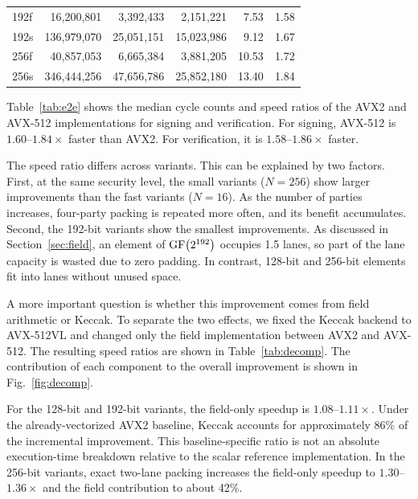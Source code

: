 \begin{table}[h]
{\begin{tabular*}{\linewidth}{
  @{\extracolsep{\fill}}lrrrrr@{}
}
192f
& 16{,}200{,}801
& 3{,}392{,}433
& 2{,}151{,}221
& 7.53
& 1.58 \\

192s
& 136{,}979{,}070
& 25{,}051{,}151
& 15{,}023{,}986
& 9.12
& 1.67 \\

256f
& 40{,}857{,}053
& 6{,}665{,}384
& 3{,}881{,}205
& 10.53
& 1.72 \\

256s
& 346{,}444{,}256
& 47{,}656{,}786
& 25{,}852{,}180
& 13.40
& 1.84 \\

\bottomrule
\end{tabular*}
}
\end{table}

Table~\ref{tab:e2e} shows the median cycle counts and speed ratios of the AVX2 and AVX-512 implementations for signing and verification. For signing, AVX-512 is $1.60$--$1.84\times$ faster than AVX2. For verification, it is $1.58$--$1.86\times$ faster.

The speed ratio differs across variants. This can be explained by two factors. First, at the same security level, the small variants ($N{=}256$) show larger improvements than the fast variants ($N{=}16$). As the number of parties increases, four-party packing is repeated more often, and its benefit accumulates. Second, the 192-bit variants show the smallest improvements. As discussed in Section~\ref{sec:field}, an element of $\operatorname{GF}\bigl(2^{192}\bigr)$ occupies 1.5 lanes, so part of the lane capacity is wasted due to zero padding. In contrast, 128-bit and 256-bit elements fit into lanes without unused space.

A more important question is whether this improvement comes from field arithmetic or Keccak. To separate the two effects, we fixed the Keccak backend to AVX-512VL and changed only the field implementation between AVX2 and AVX-512. The resulting speed ratios are shown in Table~\ref{tab:decomp}. The contribution of each component to the overall improvement is shown in Fig.~\ref{fig:decomp}.

For the 128-bit and 192-bit variants, the field-only speedup is
$1.08$--$1.11\times$. Under the already-vectorized AVX2 baseline,
Keccak accounts for approximately 86\% of the incremental improvement.
This baseline-specific ratio is not an absolute execution-time breakdown relative to the scalar reference implementation. In the 256-bit variants, exact two-lane packing increases the field-only speedup to $1.30$--$1.36\times$ and the field contribution to about 42\%.

